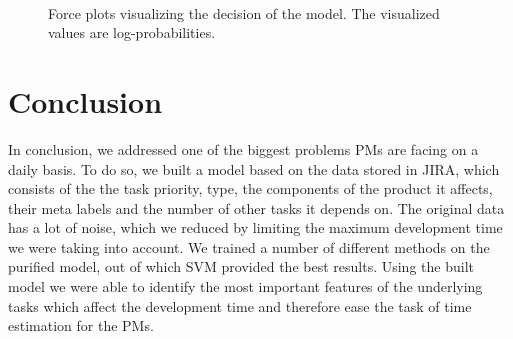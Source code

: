 \documentclass[conference,compsoc]{IEEEtran}
\begin{document}
\begin{figure}[!t]
	\centering
	 \\
	\label{force-plots}
	\caption{Force plots visualizing the decision of the model. The visualized values are log-probabilities. }
\end{figure}

\section{Conclusion}
In conclusion, we addressed one of the biggest problems PMs are facing on a daily basis. To do so, we built a model based on the data stored in JIRA, which consists of the the task priority, type, the components of the product it affects, their meta labels and the number of other tasks it depends on. The original data has a lot of noise, which we reduced by limiting the maximum development time we were taking into account. We trained a number of different methods on the purified model, out of which SVM provided the best results. Using the built model we were able to identify the most important features of the underlying tasks which affect the development time and therefore ease the task of time estimation for the PMs.




\end{document}
